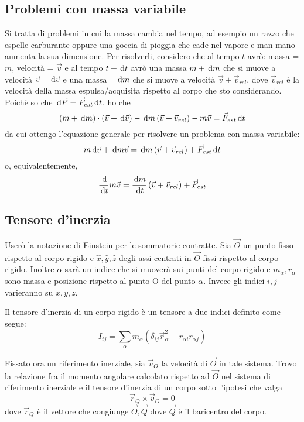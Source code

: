 \documentclass[../main.tex]{subfiles}
\begin{document}
\subsection{Problemi con massa variabile}
Si tratta di problemi in cui la massa cambia nel tempo, ad esempio un razzo che espelle carburante oppure una goccia di pioggia che cade nel vapore e man mano aumenta la sua dimensione.
Per risolverli, considero che al tempo $t$ avrò:
massa = $m$, velocità = $\vec v$
e al tempo $t+\,\mathrm{d} t$ avrò una massa $m+\,\mathrm{d} m$ che si muove a velocità $\vec v + \,\mathrm{d} \vec v$ e una massa $-\,\mathrm{d} m$ che si muove a velocità $\vec v + \vec v_{rel}$, dove $\vec v_{rel}$ è la velocità della massa espulsa/acquisita rispetto al corpo che sto considerando.
Poichè so che $\,\mathrm{d} \vec P = \vec F_{est} \,\mathrm{d} t$, ho che
$$ \left ( m + \,\mathrm{d} m \right ) \cdot \left ( \vec v + \,\mathrm{d} \vec v\right ) -\,\mathrm{d} m\left ( \vec v + \vec v_{rel} \right ) - m\vec v = \vec F_{est}\,\mathrm{d} t$$
da cui ottengo l'equazione generale per risolvere un problema con massa variabile:
\begin{equation}\label{MassaVariabile}
	m \,\mathrm{d} \vec v + \,\mathrm{d} m \vec v = \,\mathrm{d} m \left ( \vec v + \vec v_{rel} \right ) + \vec F_{est} \,\mathrm{d} t
\end{equation}
o, equivalentemente,
\begin{equation}
	\frac{\,\mathrm{d} }{\,\mathrm{d} t} m\vec v = \frac{\,\mathrm{d} m}{\,\mathrm{d} t}\left ( \vec v + \vec v_{rel} \right ) + \vec F_{est}
\end{equation}



\subsection{Tensore d'inerzia} \label{ten}
Userò la notazione di Einstein per le sommatorie contratte.
Sia $\vec O$ un punto fisso rispetto al corpo rigido e $\hat x,\hat y,\hat z$ degli assi centrati in $\vec O$ fissi rispetto al corpo rigido.
Inoltre $\alpha$ sarà un indice che si muoverà sui punti del corpo rigido e $m_\alpha,r_\alpha$ sono massa e posizione rispetto al punto O del punto $\alpha$. Invece gli indici $i,j$ varieranno su $x,y,z$.

Il tensore d'inerzia di un corpo rigido è un tensore a due indici definito come segue:
\begin{equation} \label{ten:definizione}
	I_{ij}=\sum_\alpha m_\alpha(\delta_{ij}\vec r_{\alpha}^2 -r_{\alpha i}r_{\alpha j})
\end{equation}

Fissato ora un riferimento inerziale, sia $\vec v_O$ la velocità di $\vec O$ in tale sistema. 
Trovo la relazione fra il momento angolare calcolato rispetto ad $\vec O$ nel sistema di riferimento inerziale e il tensore d'inerzia di un corpo sotto l'ipotesi che valga
\begin{equation} \label{ten:CondizioneSulCentro}
	\vec r_Q\times \vec v_O=0
\end{equation}
dove $\vec r_Q$ è il vettore che congiunge $\vec O,\vec Q$ dove $\vec Q$ è il baricentro del corpo.
\end{document}
